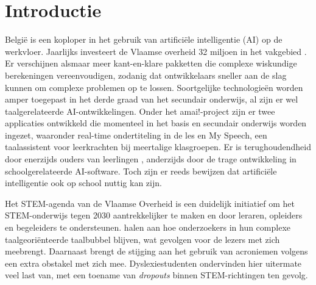 





\section{Introductie}%
\label{sec:introductie}

België is een koploper in het gebruik van artificiële intelligentie (AI) op de werkvloer. Jaarlijks investeert de Vlaamse overheid 32 miljoen in het vakgebied \autocite{Crevits2022}. Er verschijnen alsmaar meer kant-en-klare pakketten die complexe wiskundige berekeningen vereenvoudigen, zodanig dat ontwikkelaars sneller aan de slag kunnen om complexe problemen op te lossen.  Soortgelijke technologieën worden amper toegepast in het derde graad van het secundair onderwijs, al zijn er wel taalgerelateerde AI-ontwikkelingen. Onder het amai!-project  zijn er twee applicaties ontwikkeld die momenteel in het basis en secundair onderwijs worden ingezet, waaronder real-time ondertiteling in de les en My Speech, een taalassistent voor leerkrachten bij meertalige klasgroepen.  Er is terughoudendheid door enerzijds ouders van leerlingen \autocite{Martens2021}, anderzijds door de trage ontwikkeling in schoolgerelateerde AI-software. Toch zijn er reeds bewijzen dat artificiële intelligentie ook op school nuttig kan zijn. 

Het STEM-agenda van de Vlaamse Overheid is een duidelijk initiatief om het STEM-onderwijs tegen 2030 aantrekkelijker te maken en door leraren, opleiders en begeleiders te ondersteunen. \textcite{PlavenSigray2017} halen aan hoe onderzoekers in hun complexe taalgeoriënteerde taalbubbel blijven, wat gevolgen voor de lezers met zich meebrengt. Daarnaast brengt de stijging aan het gebruik van acroniemen volgens \textcite{Barnett2020} een extra obstakel met zich mee. Dyslexiestudenten ondervinden hier uitermate veel last van, met een toename van \textit{dropouts} binnen STEM-richtingen ten gevolg. %

